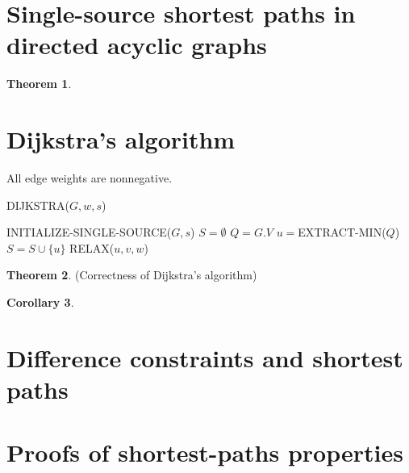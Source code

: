 \documentclass[letter]{book}
\theoremstyle{definition}
\newtheorem{theorem}{Theorem}[chapter]
\newtheorem{corollary}[theorem]{Corollary}
\theoremstyle{definition}
\theoremstyle{remark}
\begin{document}
\section{Single-source shortest paths in directed acyclic graphs}
    \begin{theorem}
    \end{theorem}
    
\section{Dijkstra's algorithm}
    All edge weights are nonnegative.
    \begin{algorithm}[H]%
        \caption{DIJKSTRA($G,w,s$)}
        \begin{algorithmic}[1] %
            \State INITIALIZE-SINGLE-SOURCE($G,s$)
            \State $S=\emptyset$
            \State $Q=G.V$
                \State $u=$EXTRACT-MIN($Q$)
                \State $S=S\cup\{u\}$
                    \State RELAX($u,v,w$)
                \EndFor
            \EndWhile
        \end{algorithmic}
    \end{algorithm}
    \begin{theorem}(Correctness of Dijkstra’s algorithm)
    \end{theorem}
    \bigskip
    \begin{corollary}
    \end{corollary}
    

\section{Difference constraints and shortest paths}


\section{Proofs of shortest-paths properties}
\end{document}
